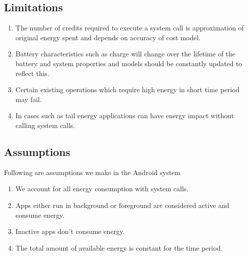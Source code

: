 \subsection{Limitations}

\begin{enumerate}

\item  The number of credits required to execute a system call is approximation of original energy spent and depends on accuracy of cost model.
\item  Battery characteristics such as charge will change over the lifetime of the battery and system properties and models should be constantly updated to reflect this.   
\item  Certain existing operations which require high energy in short time period may fail.
\item  In cases such as tail energy applications can have energy impact without calling system calls.

\end{enumerate}

\subsection{Assumptions}

Following are assumptions we make in the Android system

\begin{enumerate}

\item  We account for all energy consumption with system calls.
\item  Apps either run in background or foreground are considered active and consume energy.
\item  Inactive apps don't consume energy.
\item  The total amount of available energy is constant for the time period.

\end{enumerate}




















